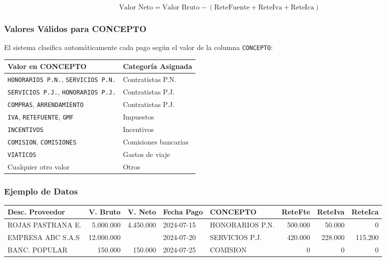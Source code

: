 \documentclass[11pt,a4paper]{article}
\begin{document}
\begin{tcolorbox}[colback=naranja!5, colframe=naranja, title=\textbf{Fórmula — Estatuto Tributario (Art. 368)}]
$$\text{Valor Neto} = \text{Valor Bruto} - (\text{ReteFuente} + \text{ReteIva} + \text{ReteIca})$$
\end{tcolorbox}

\subsubsection{Valores Válidos para CONCEPTO}

El sistema clasifica automáticamente cada pago según el valor de la columna \texttt{CONCEPTO}:

\begin{center}
\renewcommand{\arraystretch}{1.3}
\begin{tabular}{|l|l|}
\hline
\rowcolor{verde!15}
\textbf{Valor en CONCEPTO} & \textbf{Categoría Asignada} \\
\hline
\texttt{HONORARIOS P.N.}, \texttt{SERVICIOS P.N.} & Contratistas P.N. \\
\hline
\texttt{SERVICIOS P.J.}, \texttt{HONORARIOS P.J.} & Contratistas P.J. \\
\hline
\texttt{COMPRAS}, \texttt{ARRENDAMIENTO} & Contratistas P.J. \\
\hline
\texttt{IVA}, \texttt{RETEFUENTE}, \texttt{GMF} & Impuestos \\
\hline
\texttt{INCENTIVOS} & Incentivos \\
\hline
\texttt{COMISION}, \texttt{COMISIONES} & Comisiones bancarias \\
\hline
\texttt{VIATICOS} & Gastos de viaje \\
\hline
Cualquier otro valor & Otros \\
\hline
\end{tabular}
\end{center}

\subsubsection{Ejemplo de Datos}

\begin{center}
\footnotesize
\begin{tabular}{|l|r|r|l|l|r|r|r|}
\hline
\rowcolor{verde!10}
\textbf{Desc. Proveedor} & \textbf{V. Bruto} & \textbf{V. Neto} & \textbf{Fecha Pago} & \textbf{CONCEPTO} & \textbf{ReteFte} & \textbf{ReteIva} & \textbf{ReteIca} \\
\hline
ROJAS PASTRANA E. & 5.000.000 & 4.450.000 & 2024-07-15 & HONORARIOS P.N. & 500.000 & 50.000 & 0 \\
\hline
EMPRESA ABC S.A.S & 12.000.000 & & 2024-07-20 & SERVICIOS P.J. & 420.000 & 228.000 & 115.200 \\
\hline
BANC. POPULAR & 150.000 & 150.000 & 2024-07-25 & COMISION & 0 & 0 & 0 \\
\hline
\end{tabular}
\end{center}
\end{document}

